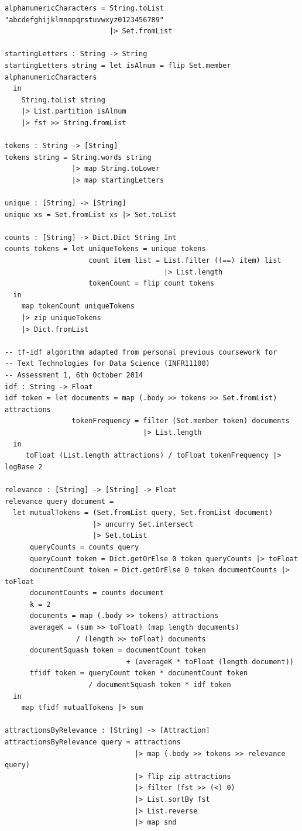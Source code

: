 \documentclass[12pt]{article}
\begin{document}
\begin{appendices}
\begin{verbatim}
alphanumericCharacters = String.toList "abcdefghijklmnopqrstuvwxyz0123456789"
                         |> Set.fromList 
  
startingLetters : String -> String
startingLetters string = let isAlnum = flip Set.member alphanumericCharacters
  in
    String.toList string  
    |> List.partition isAlnum
    |> fst >> String.fromList
  
tokens : String -> [String]
tokens string = String.words string 
                |> map String.toLower 
                |> map startingLetters

unique : [String] -> [String]
unique xs = Set.fromList xs |> Set.toList 

counts : [String] -> Dict.Dict String Int
counts tokens = let uniqueTokens = unique tokens
                    count item list = List.filter ((==) item) list 
                                      |> List.length
                    tokenCount = flip count tokens
  in
    map tokenCount uniqueTokens 
    |> zip uniqueTokens 
    |> Dict.fromList

-- tf-idf algorithm adapted from personal previous coursework for
-- Text Technologies for Data Science (INFR11100)
-- Assessment 1, 6th October 2014
idf : String -> Float
idf token = let documents = map (.body >> tokens >> Set.fromList) attractions
                tokenFrequency = filter (Set.member token) documents 
                                 |> List.length
  in 
     toFloat (List.length attractions) / toFloat tokenFrequency |> logBase 2
    
relevance : [String] -> [String] -> Float
relevance query document = 
  let mutualTokens = (Set.fromList query, Set.fromList document) 
                     |> uncurry Set.intersect 
                     |> Set.toList
      queryCounts = counts query
      queryCount token = Dict.getOrElse 0 token queryCounts |> toFloat
      documentCount token = Dict.getOrElse 0 token documentCounts |> toFloat
      documentCounts = counts document
      k = 2
      documents = map (.body >> tokens) attractions
      averageK = (sum >> toFloat) (map length documents) 
                 / (length >> toFloat) documents
      documentSquash token = documentCount token 
                             + (averageK * toFloat (length document))
      tfidf token = queryCount token * documentCount token 
                    / documentSquash token * idf token
  in
    map tfidf mutualTokens |> sum
    
attractionsByRelevance : [String] -> [Attraction]
attractionsByRelevance query = attractions
                               |> map (.body >> tokens >> relevance query)
                               |> flip zip attractions
                               |> filter (fst >> (<) 0)
                               |> List.sortBy fst
                               |> List.reverse 
                               |> map snd
\end{verbatim}

\end{appendices}
\end{document}
